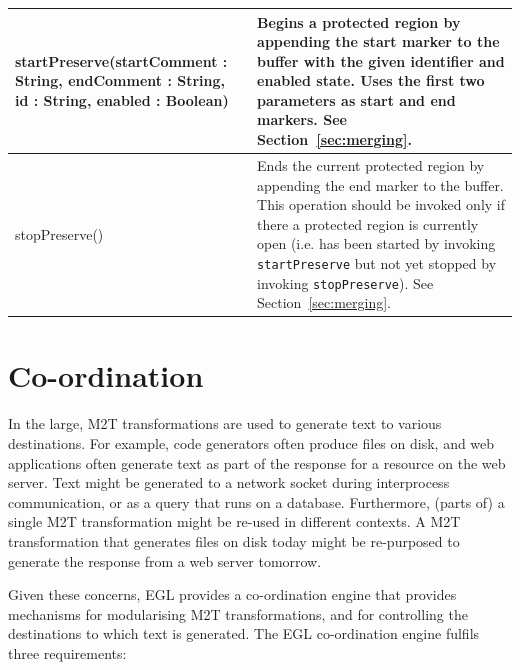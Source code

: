 \begin{longtable} {|p{5.5cm}|p{6.5cm}|}
			startPreserve(startComment : String, endComment : String, id : String, enabled : Boolean) & Begins a protected region by appending the start marker to the buffer with the given identifier and enabled state. Uses the first two parameters as start and end markers. See Section~\ref{sec:merging}. \\\hline
			
			stopPreserve() & Ends the current protected region by appending the end marker to the buffer. This operation should be invoked only if there a protected region is currently open (i.e. has been started by invoking \texttt{st\-a\-rtPr\-es\-er\-ve} but not yet stopped by invoking \texttt{st\-opPr\-es\-er\-ve}). See Section~\ref{sec:merging}. \\\hline
\end{longtable}

\section{Co-ordination}
\label{Co-ordination}
In the large, M2T transformations are used to generate text to various
destinations. For example, code generators often produce files on disk, 
and web applications often generate text as part of the response for a 
resource on the web server. Text might be generated to a network socket
during interprocess communication, or as a query that runs on a database.
Furthermore, (parts of) a single M2T transformation might be re-used in 
different contexts. A M2T transformation that generates files on disk today 
might be re-purposed to generate the response from a web server tomorrow.  

Given these concerns, EGL provides a co-ordination engine that provides
mechanisms for modularising M2T transformations, and for controlling the
destinations to which text is generated. The EGL co-ordination engine 
fulfils three requirements:

